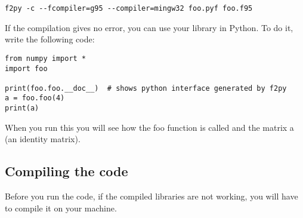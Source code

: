 \documentclass[12pt]{article}
\begin{document}
\begin{verbatim}
f2py -c --fcompiler=g95 --compiler=mingw32 foo.pyf foo.f95
\end{verbatim}
If the compilation gives no error, you can use your library in Python. To do it, write the following code:


\begin{verbatim}
from numpy import * 
import foo 

print(foo.foo.__doc__)  # shows python interface generated by f2py
a = foo.foo(4)
print(a)
\end{verbatim}
When you run this you will see how the foo function is called and the matrix a (an identity matrix).

\subsection{Compiling the code}

Before you run the code, if the compiled libraries are not working, you will have to compile it on your machine. 


\end{document}
